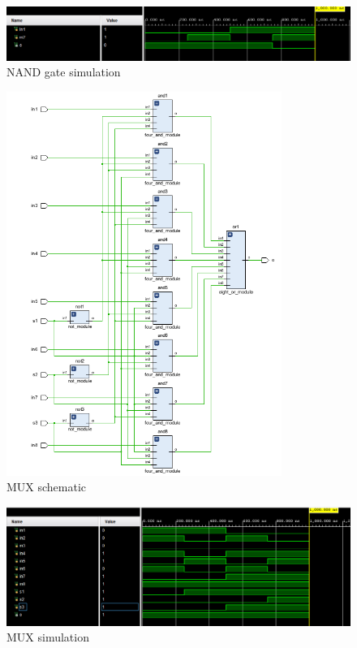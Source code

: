 \documentclass[pdftex,12pt,a4paper]{article}
\begin{document}
    \begin{figure}[H]
    	\centering
    	\includegraphics[width=1\textwidth]{simulations/nand_sim.png}	
    	\caption{NAND gate simulation}
    	\label{NAND gate simulation}
    \end{figure}

    \begin{figure}[H]
    	\centering
    	\includegraphics[width=0.8\textwidth]{schematic/mux_schematic.png}	
    	\caption{MUX schematic}
    	\label{MUX schematic}
    \end{figure}
    
    \begin{figure}[H]
    	\centering
    	\includegraphics[width=1\textwidth]{simulations/mux_sim.png}	
    	\caption{MUX simulation}
    	\label{MUX simulation}
    \end{figure}
\end{document}
